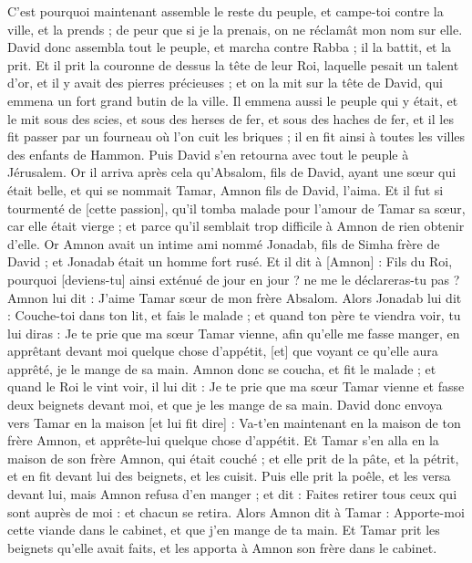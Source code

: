 \begin{multicols}{2}
C'est pourquoi maintenant assemble le reste du peuple, et campe-toi contre la ville, et la prends ; de peur que si je la prenais, on ne réclamât mon nom sur elle.
David donc assembla tout le peuple, et marcha contre Rabba ; il la battit, et la prit.
Et il prit la couronne de dessus la tête de leur Roi, laquelle pesait un talent d'or, et il y avait des pierres précieuses ; et on la mit sur la tête de David, qui emmena un fort grand butin de la ville.
Il emmena aussi le peuple qui y était, et le mit sous des scies, et sous des herses de fer, et sous des haches de fer, et il les fit passer par un fourneau où l'on cuit les briques ; il en fit ainsi à toutes les villes des enfants de Hammon. Puis David s'en retourna avec tout le peuple à Jérusalem.
\VerseOne{}Or il arriva après cela qu'Absalom, fils de David, ayant une sœur qui était belle, et qui se nommait Tamar, Amnon fils de David, l'aima.
Et il fut si tourmenté de [cette passion], qu'il tomba malade pour l'amour de Tamar sa sœur, car elle était vierge ; et parce qu'il semblait trop difficile à Amnon de rien obtenir d'elle.
Or Amnon avait un intime ami nommé Jonadab, fils de Simha frère de David ; et Jonadab était un homme fort rusé.
Et il dit à [Amnon] : Fils du Roi, pourquoi [deviens-tu] ainsi exténué de jour en jour ? ne me le déclareras-tu pas ? Amnon lui dit : J'aime Tamar sœur de mon frère Absalom.
Alors Jonadab lui dit : Couche-toi dans ton lit, et fais le malade ; et quand ton père te viendra voir, tu lui diras : Je te prie que ma sœur Tamar vienne, afin qu'elle me fasse manger, en apprêtant devant moi quelque chose d'appétit, [et] que voyant ce qu'elle aura apprêté, je le mange de sa main.
Amnon donc se coucha, et fit le malade ; et quand le Roi le vint voir, il lui dit : Je te prie que ma sœur Tamar vienne et fasse deux beignets devant moi, et que je les mange de sa main.
David donc envoya vers Tamar en la maison [et lui fit dire] : Va-t'en maintenant en la maison de ton frère Amnon, et apprête-lui quelque chose d'appétit.
Et Tamar s'en alla en la maison de son frère Amnon, qui était couché ; et elle prit de la pâte, et la pétrit, et en fit devant lui des beignets, et les cuisit.
Puis elle prit la poêle, et les versa devant lui, mais Amnon refusa d'en manger ; et dit : Faites retirer tous ceux qui sont auprès de moi : et chacun se retira.
Alors Amnon dit à Tamar : Apporte-moi cette viande dans le cabinet, et que j'en mange de ta main. Et Tamar prit les beignets qu'elle avait faits, et les apporta à Amnon son frère dans le cabinet.

\end{multicols}
